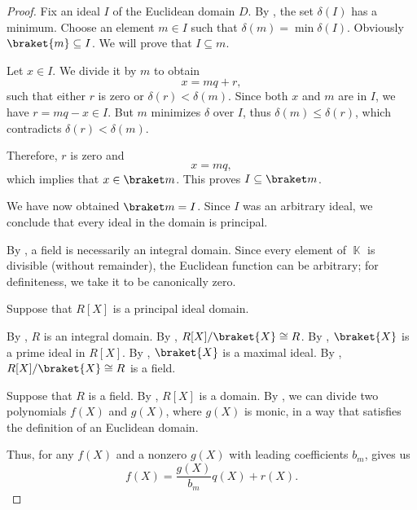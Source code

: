 \begin{proof}
   Fix an ideal \( I \) of the Euclidean domain \( D \). By , the set \( \delta(I) \) has a minimum. Choose an element \( m \in I \) such that \( \delta(m) = \min \delta(I) \). Obviously \( \braket{m} \subseteq I \). We will prove that \( I \subseteq m \).

  Let \( x \in I \). We divide it by \( m \) to obtain
  \begin{equation*}
    x = mq + r,
  \end{equation*}
  such that either \( r \) is zero or \( \delta(r) < \delta(m) \). Since both \( x \) and \( m \) are in \( I \), we have \( r = mq - x \in I \). But \( m \) minimizes \( \delta \) over \( I \), thus \( \delta(m) \leq \delta(r) \), which contradicts \( \delta(r) < \delta(m) \).

  Therefore, \( r \) is zero and
  \begin{equation*}
    x = mq,
  \end{equation*}
  which implies that \( x \in \braket m \). This proves \( I \subseteq \braket m \).

  We have now obtained \( \braket m = I \). Since \( I \) was an arbitrary ideal, we conclude that every ideal in the domain is principal.

   By , a field is necessarily an integral domain. Since every element of \( \BbbK \) is divisible (without remainder), the Euclidean function can be arbitrary; for definiteness, we take it to be canonically zero.

  \SufficiencySubProof* Suppose that \( R[X] \) is a principal ideal domain.

  By , \( R \) is an integral domain. By , \( R[X] / \braket{ X } \cong R \). By , \( \braket{ X } \) is a prime ideal in \( R[X] \). By , \( \braket{ X } \) is a maximal ideal. By , \( R[X] / \braket{ X } \cong R \) is a field.

  \NecessitySubProof* Suppose that \( R \) is a field. By , \( R[X] \) is a domain. By , we can divide two polynomials \( f(X) \) and \( g(X) \), where \( g(X) \) is monic, in a way that satisfies the definition of an Euclidean domain.

  Thus, for any \( f(X) \) and a nonzero \( g(X) \) with leading coefficients \( b_m \),  gives us
  \begin{equation*}
    f(X) = \frac {g(X)} {b_m} q(X) + r(X).
  \end{equation*}
\end{proof}

